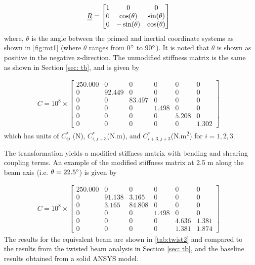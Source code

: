 \documentclass[letterpaper,12pt]{article}
\begin{document}
\begin{equation*}
\uuline{R}=\begin{bmatrix}	1 & 0 & 0   \\	0  & \cos(\theta) & \sin(\theta)  \\	0  & -\sin(\theta) &  \cos(\theta) \\ \end{bmatrix}
\end{equation*}
where, $\theta$ is the angle between the primed and inertial coordinate systems as shown in \ref{fig:rot1} (where $\theta$ ranges from 0$\degree$ to 90$\degree$). It is noted that $\theta$ is shown as positive in the negative z-direction. The unmodified stiffness matrix is the same as shown in Section \ref{sec: tb}, and is given by

\begin{align*} 
C =10^8 \times \begin{bmatrix}
	250.000 & 0   & 0   & 0  & 0    & 0    \\
	0  & 92.449 & 0   & 0  & 0    & 0    \\
	0  & 0   & 83.497 & 0  & 0    & 0    \\
	0  & 0   & 0   & 1.498 & 0    & 0    \\
	0  & 0   & 0   & 0  & 5.208 & 0    \\
	0  & 0   & 0   & 0  & 0    & 1.302
\end{bmatrix}
\end{align*}
which has units of $C^*_{ij}$ (N), $C^*_{i,j+3}$(N.m), and $C^*_{i+3, j+3}$(N.m\textsuperscript{2}) for $i=1, 2, 3$.


The transformation yields a modified stiffness matrix with bending and shearing coupling terms. An example of the modified stiffness matrix at 2.5 m along the beam axis (i.e. $\theta=22.5\degree$) is given by 

\begin{align*} 
C =10^8 \times \begin{bmatrix}
	250.000 & 0   & 0   & 0  & 0    & 0    \\
	0  & 91.138 & 3.165   & 0  & 0    & 0    \\
	0  & 3.165   & 84.808 & 0  & 0    & 0    \\
	0  & 0   & 0   & 1.498 & 0    & 0    \\
	0  & 0   & 0   & 0  & 4.636 & 1.381    \\
	0  & 0   & 0   & 0  & 1.381    & 1.874
\end{bmatrix}
\end{align*}
The results for the equivalent beam are shown in \ref{tab:twist2} and compared to the results from the twisted beam analysis in Section \ref{sec: tb}, and the baseline results obtained from a solid ANSYS model.
\end{document}

